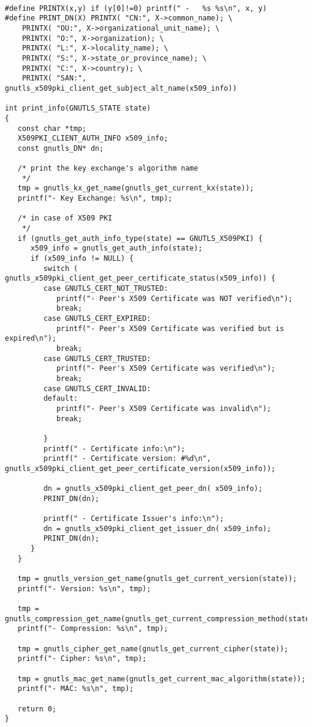 \begin{verbatim}

#define PRINTX(x,y) if (y[0]!=0) printf(" -   %s %s\n", x, y)
#define PRINT_DN(X) PRINTX( "CN:", X->common_name); \
	PRINTX( "OU:", X->organizational_unit_name); \
	PRINTX( "O:", X->organization); \
	PRINTX( "L:", X->locality_name); \
	PRINTX( "S:", X->state_or_province_name); \
	PRINTX( "C:", X->country); \
	PRINTX( "SAN:", gnutls_x509pki_client_get_subject_alt_name(x509_info))

int print_info(GNUTLS_STATE state)
{
   const char *tmp;
   X509PKI_CLIENT_AUTH_INFO x509_info;
   const gnutls_DN* dn;

   /* print the key exchange's algorithm name
    */
   tmp = gnutls_kx_get_name(gnutls_get_current_kx(state));
   printf("- Key Exchange: %s\n", tmp);

   /* in case of X509 PKI
    */
   if (gnutls_get_auth_info_type(state) == GNUTLS_X509PKI) {
      x509_info = gnutls_get_auth_info(state);
      if (x509_info != NULL) {
         switch ( gnutls_x509pki_client_get_peer_certificate_status(x509_info)) {
         case GNUTLS_CERT_NOT_TRUSTED:
            printf("- Peer's X509 Certificate was NOT verified\n");
            break;
         case GNUTLS_CERT_EXPIRED:
            printf("- Peer's X509 Certificate was verified but is expired\n");
            break;
         case GNUTLS_CERT_TRUSTED:
            printf("- Peer's X509 Certificate was verified\n");
            break;
         case GNUTLS_CERT_INVALID:
         default:
            printf("- Peer's X509 Certificate was invalid\n");
            break;

         }
         printf(" - Certificate info:\n");
         printf(" - Certificate version: #%d\n", gnutls_x509pki_client_get_peer_certificate_version(x509_info));

         dn = gnutls_x509pki_client_get_peer_dn( x509_info);
         PRINT_DN(dn);

         printf(" - Certificate Issuer's info:\n");
         dn = gnutls_x509pki_client_get_issuer_dn( x509_info);
         PRINT_DN(dn);
      }
   }

   tmp = gnutls_version_get_name(gnutls_get_current_version(state));
   printf("- Version: %s\n", tmp);

   tmp = gnutls_compression_get_name(gnutls_get_current_compression_method(state));
   printf("- Compression: %s\n", tmp);

   tmp = gnutls_cipher_get_name(gnutls_get_current_cipher(state));
   printf("- Cipher: %s\n", tmp);

   tmp = gnutls_mac_get_name(gnutls_get_current_mac_algorithm(state));
   printf("- MAC: %s\n", tmp);

   return 0;
}

\end{verbatim}
